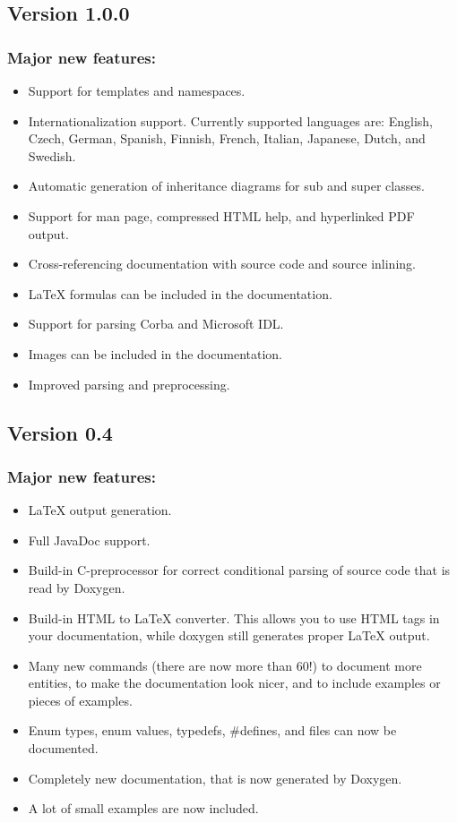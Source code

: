 \subsection*{Version 1.0.0}

\subsubsection*{Major new features:}

\begin{itemize}
\item Support for templates and namespaces. \item Internationalization support. Currently supported languages are: English, Czech, German, Spanish, Finnish, French, Italian, Japanese, Dutch, and Swedish. \item Automatic generation of inheritance diagrams for sub and super classes. \item Support for man page, compressed HTML help, and hyperlinked PDF output. \item Cross-referencing documentation with source code and source inlining. \item LaTeX formulas can be included in the documentation. \item Support for parsing Corba and Microsoft IDL. \item Images can be included in the documentation. \item Improved parsing and preprocessing. \end{itemize}


\subsection*{Version 0.4}

\subsubsection*{Major new features:}

\begin{itemize}
\item LaTeX output generation. \item Full JavaDoc support. \item Build-in C-preprocessor for correct conditional parsing of source code that is read by Doxygen. \item Build-in HTML to LaTeX converter. This allows you to use HTML tags in your documentation, while doxygen still generates proper LaTeX output. \item Many new commands (there are now more than 60!) to document more entities, to make the documentation look nicer, and to include examples or pieces of examples. \item Enum types, enum values, typedefs, \#defines, and files can now be documented. \item Completely new documentation, that is now generated by Doxygen. \item A lot of small examples are now included. \end{itemize}


